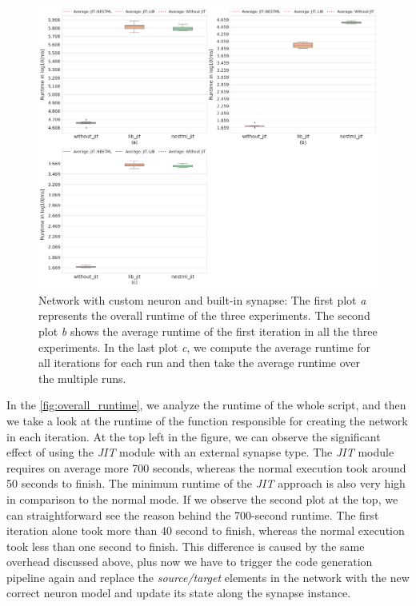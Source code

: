 \begin{figure}[ht!]
    \centering
    \includegraphics[width=\textwidth]{src/pic/three_plots.png}
    \caption{Network with custom neuron and built-in synapse: The first plot \emph{a} represents the overall runtime of the three experiments. The second plot \emph{b} shows the average runtime of the first iteration in all the three experiments. In the last plot \emph{c}, we compute the average runtime for all iterations for each run and then take the average runtime over the multiple runs. }
    \label{fig:overall_runtime}
\end{figure}

In the \autoref{fig:overall_runtime}, we analyze the runtime of the whole script, and then we take a look at the runtime of the function responsible for creating the network in each iteration. At the top left in the figure, we can observe the significant effect of using the \emph{JIT} module with an external synapse type.  The \emph{JIT} module requires on average more 700 seconds, whereas the normal execution took around 50 seconds to finish. The minimum runtime of the \emph{JIT} approach is also very high in comparison to the normal mode. If we observe the second plot at the top, we can straightforward see the reason behind the 700-second runtime. The first iteration alone took more than 40 second to finish, whereas the normal execution took less than one second to finish. This difference is caused by the same overhead discussed above, plus now we have to  trigger the code generation pipeline again and replace the \emph{source/target} elements in the network with the new correct neuron model and update its state along the synapse instance. 

